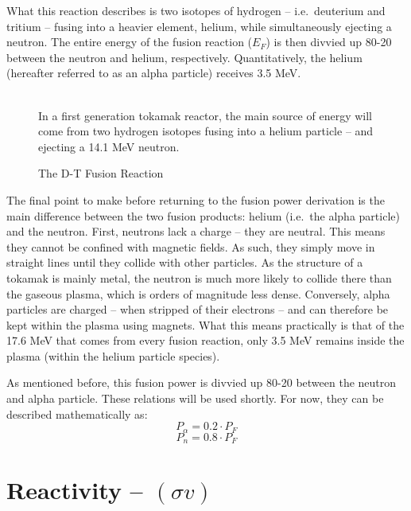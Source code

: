 What this reaction describes is two isotopes of hydrogen -- i.e.\ deuterium and tritium -- fusing into a heavier element, helium, while simultaneously ejecting a neutron. The entire energy of the fusion reaction ($E_F$) is then divvied up 80-20 between the neutron and helium, respectively. Quantitatively, the helium (hereafter referred to as an alpha particle) receives 3.5 MeV.

\begin{figure}
	\centering
	\begin{adjustbox}{width=0.75\textwidth}
		
	\end{adjustbox}
	\caption{The D-T Fusion Reaction} ~\\
	\small In a first generation tokamak reactor, the main source of energy will come from two hydrogen isotopes fusing into a helium particle -- and ejecting a 14.1 MeV neutron.
\end{figure}

The final point to make before returning to the fusion power derivation is the main difference between the two fusion products: helium (i.e.\ the alpha particle) and the neutron. First, neutrons lack a charge -- they are neutral. This means they cannot be confined with magnetic fields. As such, they simply move in straight lines until they collide with other particles. As the structure of a tokamak is mainly metal, the neutron is much more likely to collide there than the gaseous plasma, which is orders of magnitude less dense. Conversely, alpha particles are charged -- when stripped of their electrons -- and can therefore be kept within the plasma using magnets. What this means practically is that of the 17.6 MeV that comes from every fusion reaction, only 3.5 MeV remains inside the plasma (within the helium particle species).

As mentioned before, this fusion power is divvied up 80-20 between the neutron and alpha particle. These relations will be used shortly. For now, they can be described mathematically as:
\begin{equation}
	P_\alpha = 0.2 \cdot P_F
\end{equation}
\begin{equation}
	P_n = 0.8 \cdot P_F
\end{equation}

\section{Reactivity -- $(\sigma v)$}

